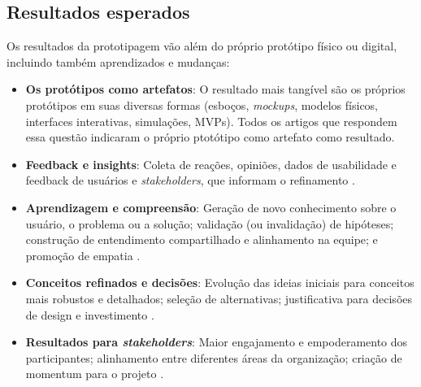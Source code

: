 \subsection{Resultados esperados}

Os resultados da prototipagem vão além do próprio protótipo físico ou digital, incluindo também aprendizados e mudanças:

\begin{itemize}
	\item \textbf{Os protótipos como artefatos}: O resultado mais tangível são os próprios protótipos em suas diversas formas (esboços, \textit{mockups}, modelos físicos, interfaces interativas, simulações, MVPs). Todos os artigos que respondem essa questão indicaram o próprio ptotótipo como artefato como resultado.
	
	\item \textbf{Feedback e insights}: Coleta de reações, opiniões, dados de usabilidade e feedback de usuários e \textit{stakeholders}, que informam o refinamento \cite{paust2025integrative, asbjornsen2022echange, kumar2023rheumatology, giraldo2024ecotourism, yan2022pssvalue, villa2022integratedcare}.
	
	\item \textbf{Aprendizagem e compreensão}: Geração de novo conhecimento sobre o usuário, o problema ou a solução; validação (ou invalidação) de hipóteses; construção de entendimento compartilhado e alinhamento na equipe; e promoção de empatia \cite{paust2025integrative, soto2023prototyping, you2022applying, lambe2022capabilities, mager2023product}.
	
	\item \textbf{Conceitos refinados e decisões}: Evolução das ideias iniciais para conceitos mais robustos e detalhados; seleção de alternativas; justificativa para decisões de design e investimento \cite{mager2023product, nguyen2022human, Vieira2025, schlott2024design, seko2024transitions}.
	
	\item \textbf{Resultados para \textit{stakeholders}}: Maior engajamento e empoderamento dos participantes; alinhamento entre diferentes áreas da organização; criação de momentum para o projeto \cite{paust2025integrative, lambe2022capabilities, kumar2023rheumatology}.
\end{itemize}



